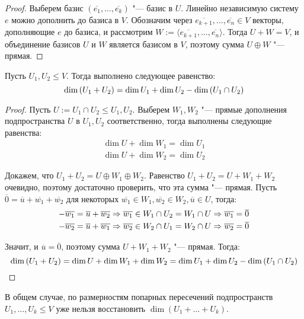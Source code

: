 \begin{proof}
	Выберем базис $(\overline{e_1}, \dots, \overline{e_k})$ "--- базис в $U$. Линейно независимую систему $e$ можно дополнить до базиса в $V$. Обозначим через $\overline{e_{k+1}}, \dots, \overline{e_n} \in V$ векторы, дополняющие $e$ до базиса, и рассмотрим $W := \langle \overline{e_{k+1}}, \dots, \overline{e_n}\rangle$. Тогда $U + W = V$, и объединение базисов $U$ и $W$ является базисом в $V$, поэтому сумма $U \oplus W$ "--- прямая.
\end{proof}

\begin{theorem}
	Пусть $U_1, U_2 \le V$. Тогда выполнено следующее равенство:
	\[\dim{(U_1 + U_2)} = \dim{U_1} \hm{+} \dim{U_2} - \dim{(U_1 \cap U_2)}\]
\end{theorem}

\begin{proof}
	Пусть $U := U_1 \cap U_2 \le U_1, U_2$. Выберем $W_1, W_2$ "--- прямые дополнения подпространства $U$ в $U_1, U_2$ соответственно, тогда выполнены следующие равенства:
	\begin{gather*}
		\dim{U} + \dim{W_1} = \dim{U_1}
		\\
		\dim{U} + \dim{W_2} = \dim{U_2}
	\end{gather*}
	
	Докажем, что $U_1 + U_2 = U \oplus W_1 \oplus W_2$. Равенство $U_1 + U_2 = U + W_1 + W_2$ очевидно, поэтому достаточно проверить, что эта сумма "--- прямая. Пусть $\overline{0} = \overline{u} + \overline{w_1} + \overline{w_2}$ для некоторых $\overline{w_1} \in W_1, \overline{w_2} \in W_2, \overline{u} \in U$, тогда:
	\begin{gather*}
		-\overline{w_1} = \overline{u} + \overline{w_2} \Rightarrow \overline{w_1} \in W_1 \cap U_2 = W_1 \cap U \Rightarrow \overline{w_1} = \overline{0}
		\\
		-\overline{w_2} = \overline{u} + \overline{w_1} \Rightarrow \overline{w_2} \in W_2 \cap U_1 = W_2 \cap U \Rightarrow \overline{w_2} = \overline{0}
	\end{gather*}

	Значит, и $\overline{u} = \overline{0}$, поэтому сумма $U + W_1 + W_2$ "--- прямая. Тогда:
	\[\dim{(U_1 + U_2)} = \dim{U} + \dim{W_1} + \dim{W_2} = \dim{U_1} \hm{+} \dim{U_2} - \dim{(U_1 \cap U_2)}\qedhere\]
\end{proof}

\begin{note}
	В общем случае, по размерностям попарных пересечений подпространств $U_1, \dotsc, U_k \le V$ уже нельзя восстановить $\dim(U_1 + \dots + U_k)$.
\end{note}

